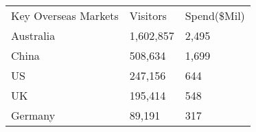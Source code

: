 \begin{tabular}[t]{p{5.1cm}>{\hfill}p{1.1cm}>{\hfill}p{1.3cm}}
 Key Overseas Markets & Visitors & Spend(\$Mil) \\ 
 Australia & 1,602,857 & 2,495 \\ 
  China &   508,634 & 1,699 \\ 
  US &   247,156 & 644 \\ 
  UK &   195,414 & 548 \\ 
  Germany &    89,191 & 317 \\ 
  \end{tabular}
